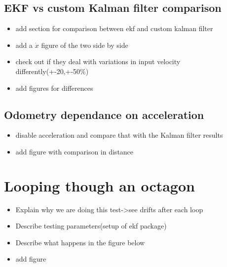 \subsection{EKF vs custom Kalman filter comparison}\label{subsec:ekfvscust}
\begin{itemize}
 \item add section for comparison between ekf and custom kalman filter
 \item add a $\dot{x}$ figure of the two side by side
 \item check out if they deal with variations in input velocity differently(+-20,+-50\%)
 \item add figures for differences
\end{itemize}

\subsection{Odometry dependance on acceleration}\label{subsec:odomdepaccel}
\begin{itemize}
 \item disable acceleration and compare that with the Kalman filter results
 \item add figure with comparison in distance
\end{itemize}

\section{Looping though an octagon}\label{sec:octagon}

\begin{itemize}
 \item Explain why we are doing this test->see drifts after each loop
 \item Describe testing parameters(setup of ekf package)
 \item Describe what happens in the figure below
 \item add figure
\end{itemize}

